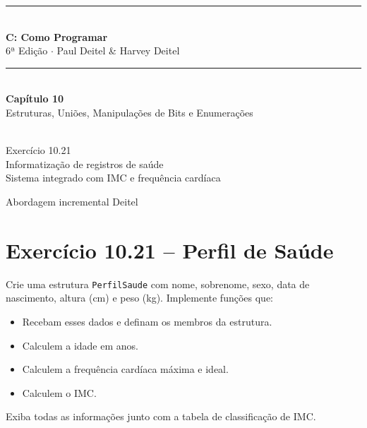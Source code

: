 \documentclass[12pt,a4paper]{article}
\begin{document}
\begin{titlepage}
  \centering\vspace*{2cm}
  {\color{deitelblue}\rule{\linewidth}{2pt}}\\[0.4cm]
  {\huge\bfseries\color{deitelblue}C: Como Programar}\\[0.2cm]
  {\large\color{deitelblue}6ª Edição $\cdot$ Paul Deitel \& Harvey Deitel}\\[0.2cm]
  {\color{deitelblue}\rule{\linewidth}{2pt}}\\[1cm]
  {\LARGE\bfseries Capítulo 10}\\[0.3cm]
  {\Large\color{deitelblue!80}Estruturas, Uniões, Manipulações de Bits e Enumerações}\\[0.8cm]
  \begin{tcolorbox}[colback=ecolightgreen,colframe=ecogreen,width=0.85\linewidth]
    \\[0.3cm]
    {\normalsize Exercício 10.21\\[0.2cm]
    Informatização de registros de saúde\\
    Sistema integrado com IMC e frequência cardíaca}
  \end{tcolorbox}
  \vfill{\small Abordagem incremental Deitel}
\end{titlepage}

\tableofcontents\newpage

\section{Exercício 10.21 -- Perfil de Saúde}

\begin{enunciadoBox}[Enunciado 10.21]
Crie uma estrutura \texttt{PerfilSaude} com nome, sobrenome, sexo, data de
nascimento, altura (cm) e peso (kg). Implemente funções que:
\begin{itemize}[noitemsep]
  \item Recebam esses dados e definam os membros da estrutura.
  \item Calculem a idade em anos.
  \item Calculem a frequência cardíaca máxima e ideal.
  \item Calculem o IMC.
\end{itemize}
Exiba todas as informações junto com a tabela de classificação de IMC.
\end{enunciadoBox}
\end{document}
